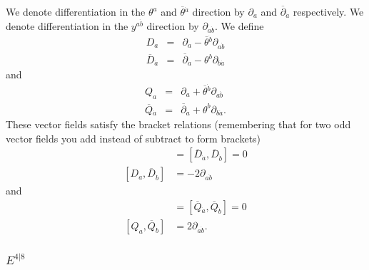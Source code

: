 \documentclass[twoside]{amsart}
\newcommand{\mytexorpdfstring}[2]{\texorpdfstring{#1}{#2}}
\newcommand{\enm}[1]{\ensuremath{#1}}
\newcommand{\superijk}[3]{\enm{{#1}^{#2|#3}}}
\newcommand{\rrij}[2]{\superijk{E}{#1}{#2}}
\renewcommand{\bar}[1]{\overline{#1}}
\newcommand{\di}[1]{\enm{\partial_{#1}}}
\newcommand{\dicj}[1]{\enm{\bar{\partial}_{\dot{#1}}}}
\newcommand{\dieven}[2]{\enm{\partial_{#1\dot{#2}}}}
\newcommand{\cjsup}[2]{\enm{\bar#1{} ^{{\dot{#2 }}}}} %
\newcommand{\cjsub}[2]{\enm{\bar#1{} _{{\dot{#2 }}}}} %
\newcommand{\odi}[1]{\enm{D_{#1}}}
\newcommand{\odicj}[1]{\enm{\cjsub{D}{#1}}}
\newcommand{\oda}{\odi{a}}
\newcommand{\odacj}{\odicj{a}}
\newcommand{\oqi}[1]{\enm{Q_{#1}}}
\newcommand{\oqicj}[1]{\enm{\cjsub{Q}{#1}}}
\newcommand{\oqa}{\oqi{a}}
\newcommand{\oqacj}{\oqicj{a}}
\newcommand{\even}[3]{\enm{{#1}^{#2 \dot{#3}}}}
\begin{document}
We denote differentiation in the \( \theta^{a} \) and \(
\cjsup{\theta}{a} \) direction by \di{a} and \dicj{a} respectively.
We denote differentiation in the \even{y}{a}{b} direction by
\dieven{a}{b}.  We define
\begin{eqnarray*}
    \oda & = & \di{a}- \cjsup{\theta}{b}\dieven{a}{b}\\
    \odacj & = & \dicj{a}- \theta^{b}\dieven{b}{a}
    \label{eq:defoda}
\end{eqnarray*}
and
\begin{eqnarray*}
    \oqa   & = & \di{a}+ \cjsup{\theta}{b}\dieven{a}{b}\\
    \oqacj & = & \dicj{a}+ \theta^{b}\dieven{b}{a}.
    \label{eq:defoqa}
\end{eqnarray*}
These vector fields satisfy the bracket relations (remembering that
for two odd vector fields you add instead of subtract to form
brackets)
\begin{align*}
[\oda,\odi{b}]    & = [\odacj,\odicj{b}]=0\\%
{}[\oda,\odicj{b}]  & = -2\dieven{a}{b}
\end{align*}
and
\begin{align*}
[\oqa, \oqi{b}]   & =  [\oqacj,\oqicj{b}] = 0 \\%
{}[\oqa, \oqicj{b}] & = 2\dieven{a}{b}.
\end{align*}

\subsubsection{\mytexorpdfstring{\rrij{4}{8}}{E(4|8)}}
\end{document}
